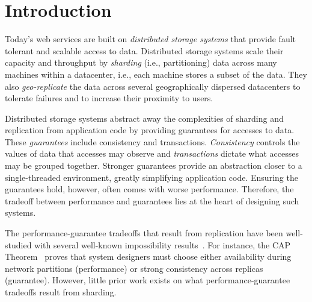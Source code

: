 \section{Introduction}
\label{sec:intro}
Today's web services are built on \textit{distributed storage systems} that provide fault tolerant and scalable access to data.
Distributed storage systems scale their capacity and throughput by \textit{sharding} (i.e., partitioning) data across many machines within a datacenter, i.e., each machine stores a subset of the data.
They also \textit{geo-replicate} the data across several geographically dispersed datacenters to tolerate failures and to increase their proximity to users.

Distributed storage systems abstract away the complexities of sharding and replication from application code by providing guarantees for accesses to data.
These \textit{guarantees} include consistency and transactions.
\textit{Consistency} controls the values of data that accesses may observe
and \textit{transactions} dictate what accesses may be grouped together.
Stronger guarantees provide an abstraction closer to a single-threaded environment, greatly simplifying application code.
Ensuring the guarantees hold, however, often comes with worse performance.
Therefore, the tradeoff between performance and guarantees lies at the heart of designing such systems.


The performance-guarantee tradeoffs that result from replication have been well-studied with several well-known impossibility results~\cite{AW94, Fischer:pds1983,Gilbert:sigact2002, lipton88pram}.
For instance, the CAP Theorem~\cite{Gilbert:sigact2002} proves that system designers must choose either availability during network partitions (performance) or strong consistency across replicas (guarantee).
However, little prior work exists on what performance-guarantee tradeoffs result from sharding.

